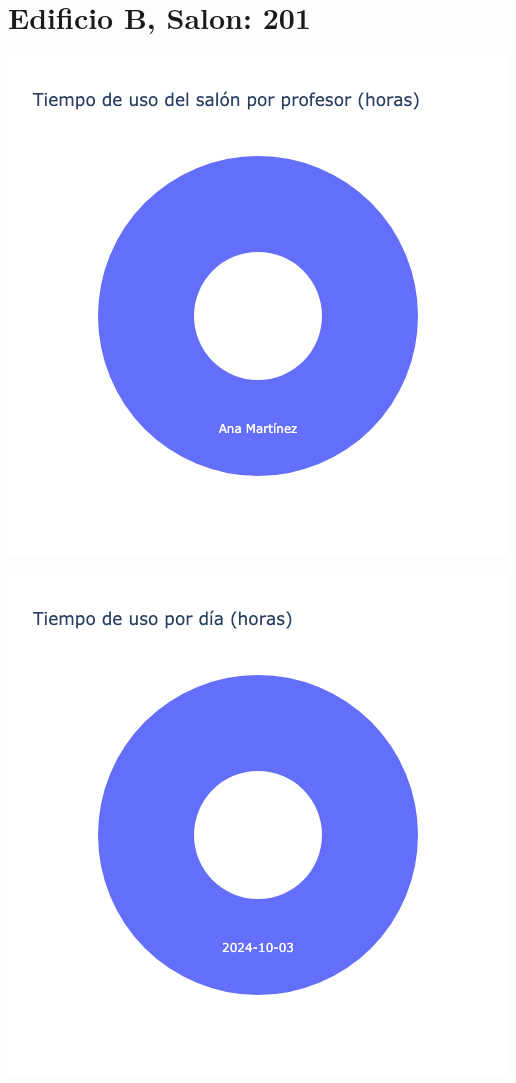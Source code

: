 \documentclass{article}
\begin{document}
    \section{Edificio B, Salon: 201}
    \noindent
    \begin{minipage}{0.48\textwidth}
        \centering
        \includegraphics[width=\textwidth]{../img/pie/UP201-90Dias-03-12-2024.png}
    \end{minipage}
    \hfill
    \begin{minipage}{0.48\textwidth}
        \centering
        \includegraphics[width=\textwidth]{../img/pie/UD201-90Dias-03-12-2024.png}
    \end{minipage}
    
\end{document}
